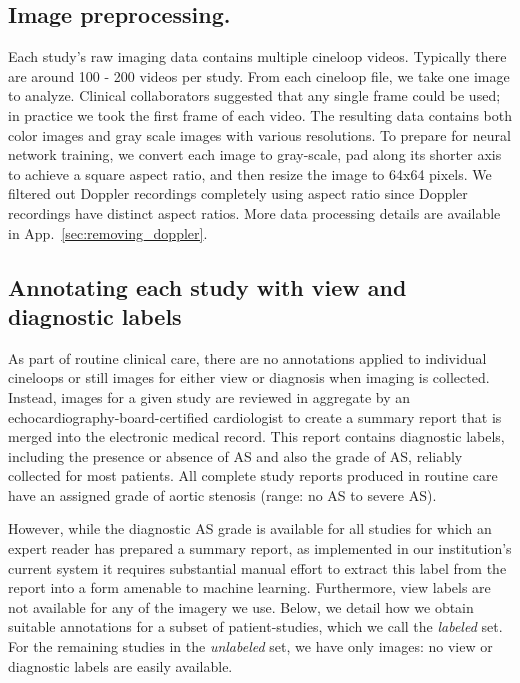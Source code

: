 \subsection{Image preprocessing.}
\label{sec:image_preprocessing}
Each study's raw imaging data contains multiple cineloop videos.
Typically there are around 100 - 200 videos per study.
From each cineloop file, we take one image to analyze.
Clinical collaborators suggested that any single frame could be used; in practice we took the first frame of each video.
The resulting data contains both color images and gray scale images with various resolutions. To prepare for neural network training, we convert each image to gray-scale, pad along its shorter axis to achieve a square aspect ratio, and then resize the image to 64x64 pixels. We filtered out Doppler recordings completely using aspect ratio since Doppler recordings have distinct aspect ratios. More data processing details are available in App.~\ref{sec:removing_doppler}.  


\subsection{Annotating each study with view and diagnostic labels}

As part of routine clinical care, there are no annotations applied to individual cineloops or still images for either view or diagnosis when imaging is collected.
Instead, images for a given study are reviewed in aggregate by an echocardiography-board-certified cardiologist to create a summary report that is merged into the electronic medical record.
This report contains diagnostic labels, including the presence or absence of AS and also the grade of AS, reliably collected for most patients.
All complete study reports produced in routine care have an assigned grade of aortic stenosis (range: no AS to severe AS).

However, while the diagnostic AS grade is available for all studies for which an expert reader has prepared a summary report, as implemented in our institution's current system it requires substantial manual effort to extract this label from the report into a form amenable to machine learning.
Furthermore, view labels are not available for any of the imagery we use.
Below, we detail how we obtain suitable annotations for a subset of patient-studies, which we call the \emph{labeled} set.
For the remaining studies in the \emph{unlabeled} set, we have only images: no view or diagnostic labels are easily available.

